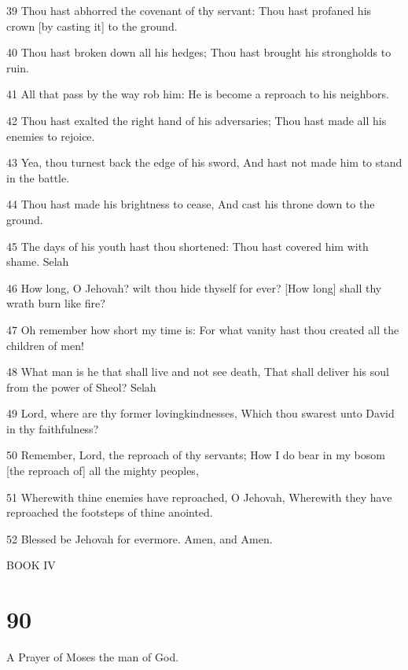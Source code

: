 \par 39 Thou hast abhorred the covenant of thy servant: Thou hast profaned his crown [by casting it] to the ground.
\par 40 Thou hast broken down all his hedges; Thou hast brought his strongholds to ruin.
\par 41 All that pass by the way rob him: He is become a reproach to his neighbors.
\par 42 Thou hast exalted the right hand of his adversaries; Thou hast made all his enemies to rejoice.
\par 43 Yea, thou turnest back the edge of his sword, And hast not made him to stand in the battle.
\par 44 Thou hast made his brightness to cease, And cast his throne down to the ground.
\par 45 The days of his youth hast thou shortened: Thou hast covered him with shame. Selah
\par 46 How long, O Jehovah? wilt thou hide thyself for ever? [How long] shall thy wrath burn like fire?
\par 47 Oh remember how short my time is: For what vanity hast thou created all the children of men!
\par 48 What man is he that shall live and not see death, That shall deliver his soul from the power of Sheol? Selah
\par 49 Lord, where are thy former lovingkindnesses, Which thou swarest unto David in thy faithfulness?
\par 50 Remember, Lord, the reproach of thy servants; How I do bear in my bosom [the reproach of] all the mighty peoples,
\par 51 Wherewith thine enemies have reproached, O Jehovah, Wherewith they have reproached the footsteps of thine anointed.
\par 52 Blessed be Jehovah for evermore. Amen, and Amen.

\par BOOK IV


\chapter{90}

\par A Prayer of Moses the man of God.

